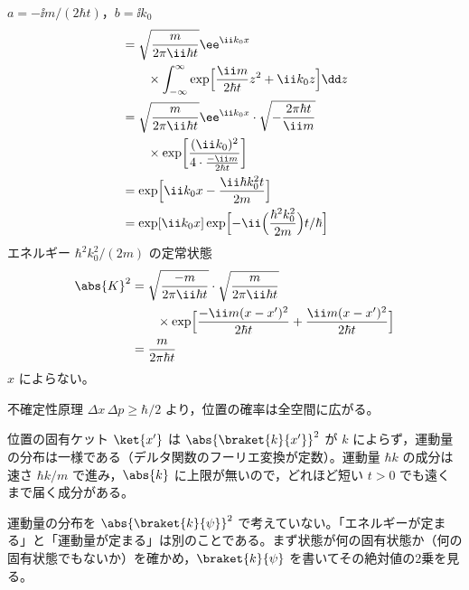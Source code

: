 $a=-\ii m/(2\hbar t)$，$b=\ii k_{0}$
\begin{align*}
&=\sqrt{\frac{m}{2\pi\ii\hbar t}}\ee^{\ii k_{0}x}\\
&\qquad\times\int_{-\infty}^{\infty}\exp\Bigl[\frac{\ii m}{2\hbar t}z^{2}+\ii k_{0}z\Bigr]\dd z\\
&=\sqrt{\frac{m}{2\pi\ii\hbar t}}\ee^{\ii k_{0}x}\cdot\sqrt{-\frac{2\pi\hbar t}{\ii m}}\\
&\qquad\times\exp\biggl[\frac{(\ii k_{0})^{2}}{4\cdot\frac{-\ii m}{2\hbar t}}\biggr]\\
&=\exp\Bigl[\ii k_{0}x-\frac{\ii\hbar k_{0}^{2}t}{2m}\Bigr]\\
&=\exp[\ii k_{0}x]\exp\Bigl[-\ii\Bigl(\frac{\hbar^{2}k_{0}^{2}}{2m}\Bigr)t/\hbar\Bigr]
\end{align*}
エネルギー $\hbar^{2}k_{0}^{2}/(2m)$ の定常状態
\begin{align*}
\abs{K}^{2}&=\sqrt{\frac{-m}{2\pi\ii\hbar t}}\cdot\sqrt{\frac{m}{2\pi\ii\hbar t}}\\
&\qquad\times\exp\Bigl[\frac{-\ii m(x-x')^{2}}{2\hbar t}+\frac{\ii m(x-x')^{2}}{2\hbar t}\Bigr]\\
&=\frac{m}{2\pi\hbar t}
\end{align*}
$x$ によらない。

不確定性原理 $\Delta x\,\Delta p\ge\hbar/2$ より，位置の確率は全空間に広がる。
\item 位置の固有ケット $\ket{x'}$ は $\abs{\braket{k}{x'}}^{2}$ が $k$ によらず，運動量の分布は一様である（デルタ関数のフーリエ変換が定数）。運動量 $\hbar k$ の成分は速さ $\hbar k/m$ で進み，$\abs{k}$ に上限が無いので，どれほど短い $t>0$ でも遠くまで届く成分がある。
\item {} 運動量の分布を $\abs{\braket{k}{\psi}}^{2}$ で考えていない。「エネルギーが定まる」と「運動量が定まる」は別のことである。まず状態が何の固有状態か（何の固有状態でもないか）を確かめ，$\braket{k}{\psi}$ を書いてその絶対値の2乗を見る。
